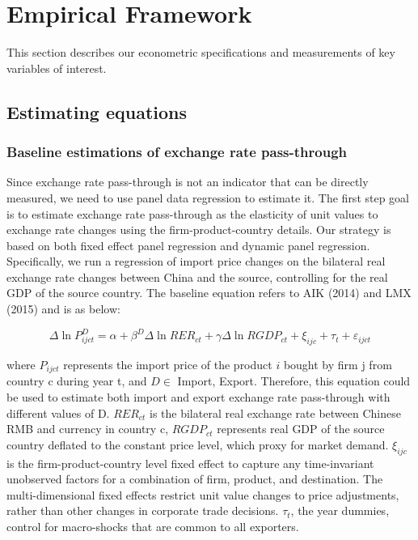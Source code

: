 \chapter{Empirical Framework}\label{sec-4.framework}
This section describes our econometric specifications and measurements of key variables of interest.

\section{Estimating equations}

\subsection{Baseline estimations of exchange rate pass-through}

Since exchange rate pass-through is not an indicator that can be directly measured, we need to use panel data regression to estimate it. The first step goal is to estimate exchange rate pass-through as the elasticity of unit values to exchange rate changes using the firm-product-country details. Our strategy is based on both fixed effect panel regression and dynamic panel regression. Specifically, we run a regression of import price changes on the bilateral real exchange rate changes between China and the source, controlling for the real GDP of the source country. The baseline equation refers to AIK (2014)\cite{aik2014} and LMX (2015)\cite{lmx2015} and is as below:

\begin{equation}
\Delta \ln P^{D}_{i j c t}=\alpha+\beta^D \Delta \ln R E R_{c t}+\gamma \Delta \ln R G D P_{c t}+\xi_{i j c}+\tau_{t}+\varepsilon_{i j c t}
\end{equation}

where $P_{ijct}$ represents the import price of the product $i$ bought by firm j from country c during year t, and $D \in$ {Import, Export}. Therefore, this equation could be used to estimate both import and export exchange rate pass-through with different values of D. $R E R_{c t}$ is the bilateral real exchange rate between Chinese RMB and currency in country c, $RGDP_{ct}$ represents real GDP of the source country deflated to the constant price level, which proxy for market demand. $\xi_{ijc}$ is the firm-product-country level fixed effect to capture any time-invariant unobserved factors for a combination of firm, product, and destination. The multi-dimensional fixed effects restrict unit value changes to price adjustments, rather than other changes in corporate trade decisions. $\tau_t$, the year dummies, control for macro-shocks that are common to all exporters.


